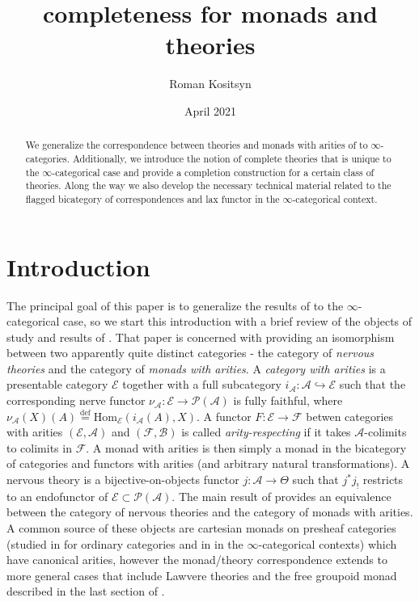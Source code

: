 \documentclass[a4paper, reqno]{amsart}
\title{completeness for monads and theories}
\author{Roman Kositsyn}
\date{April 2021}
\theoremstyle{definition}
\newcommand\cA{\mathscr A}
\newcommand\cB{\mathscr B}
\newcommand\cE{\mathscr E}
\newcommand\cF{\mathscr F}
\newcommand\cP{\mathscr P}
\newcommand\mor{\mathrm{Hom}}
\newcommand\bydef{\overset{\mathrm{def}}{=}}
\begin{document}
\maketitle
\begin{abstract}
    We generalize the correspondence between theories and monads with arities of \cite{berger2012monads} to $\infty$-categories. Additionally, we introduce the notion of complete theories that is unique to the $\infty$-categorical case and provide a completion construction for a certain class of theories. Along the way we also develop the necessary technical material related to the flagged bicategory of correspondences and lax functor in the $\infty$-categorical context.
\end{abstract}

\tableofcontents

\section{Introduction}\label{sect:one}
The principal goal of this paper is to generalize the results of \cite{berger2012monads} to the $\infty$-categorical case, so we start this introduction with a brief review of the objects of study and results of \cite{berger2012monads}. That paper is concerned with providing an isomorphism between two apparently quite distinct categories - the category of \textit{nervous theories} and the category of \textit{monads with arities}. A \textit{category with arities} is a presentable category $\cE$ together with a full subcategory $i_\cA:\cA\hookrightarrow\cE$ such that the corresponding nerve functor $\nu_\cA:\cE\rightarrow\cP(\cA)$ is fully faithful, where $\nu_\cA(X)(A)\bydef\mor_\cE(i_\cA(A),X)$. A functor $F:\cE\rightarrow\cF$ betwen categories with arities $(\cE,\cA)$ and $(\cF,\cB)$ is called \textit{arity-respecting} if it takes $\cA$-colimits to colimits in $\cF$. A monad with arities is then simply a monad in the bicategory of categories and functors with arities (and arbitrary natural transformations). A nervous theory is a bijective-on-objects functor $j:\cA\rightarrow\Theta$ such that $j^*j_!$ restricts to an endofunctor of $\cE\subset\cP(\cA)$. The main result of \cite{berger2012monads} provides an equivalence between the category of nervous theories and the category of monads with arities. A common source of these objects are cartesian monads on presheaf categories (studied in \cite{weber2004generic} for ordinary categories and in \cite{chu2019homotopy} in the $\infty$-categorical contexts) which have canonical arities, however the monad/theory correspondence extends to more general cases that include Lawvere theories \cite{lawvere1963functorial} and the free groupoid monad described in the last section of \cite{berger2012monads}.\par
\end{document}
